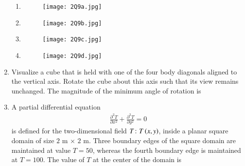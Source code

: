 \documentclass[journal,12pt,onecolumn]{article}
\theoremstyle{remark}
\begin{document}
\begin{enumerate}
    \hfill{}
    \begin{multicols}{2}
    \begin{enumerate}
    \item \begin{figure}[H]
        \centering
        \texttt{[image: 2Q9a.jpg]}
        \caption{}
        \label{fig:q9}
    \end{figure}
    \item \begin{figure}[H]
        \centering
        \texttt{[image: 2Q9b.jpg]}
        \caption{}
        \label{fig:q9}
    \end{figure}
    \item \begin{figure}[H]
        \centering
        \texttt{[image: 2Q9c.jpg]}
        \caption{}
        \label{fig:q9}
    \end{figure}
    \item \begin{figure}[H]
        \centering
        \texttt{[image: 2Q9d.jpg]}
        \caption{}
        \label{fig:q9}
    \end{figure}
    \end{enumerate}
    \end{multicols}

    \item Visualize a cube that is held with one of the four body diagonals aligned to the vertical axis. Rotate the cube about this axis such that its view remains unchanged.
    The magnitude of the minimum angle of rotation is
    
    \hfill{}
    \begin{enumerate}
    \end{enumerate}

    \item A partial differential equation
    \begin{align}
    \frac{\partial^2 T}{\partial x^2} + \frac{\partial^2 T}{\partial y^2} = 0
    \end{align}
    is defined for the two-dimensional field $T\colon T\left(x, y\right)$, inside a planar square domain
    of size $2$ m $\times$ $2$ m. Three boundary edges of the square domain are maintained at
    value $T = 50$, whereas the fourth boundary edge is maintained at
    $T = 100$.
    The value of $T$ at the center of the domain is
    

\end{enumerate}
\end{document}
